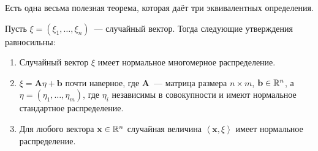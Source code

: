 Есть одна весьма полезная теорема, которая даёт три эквивалентных определения.
\begin{theorem}
	Пусть \(\xi = (\xi_{1}, \dots, \xi_{n})\)~--- случайный вектор. Тогда следующие утверждения равносильны:
	\begin{enumerate}
		\item Случайный вектор \(\xi\) имеет нормальное многомерное распределение.
		\item \(\xi = \mathbf{A}\eta + \mathbf{b}\) почти наверное, где \(\mathbf{A}\)~--- матрица размера \(n \times m\), \(\mathbf{b} \in \mathbb{R}^n\), а \(\eta = (\eta_{1}, \dots, \eta_{m})\), где \(\eta_{i}\) независимы в совокупности и имеют нормальное стандартное распределение.
		\item Для любого вектора \(\mathbf{x} \in \mathbb{R}^n\) случайная величина \(\left\langle\mathbf{x}, \xi\right\rangle\) имеет нормальное распределение.
	\end{enumerate}
\end{theorem}
